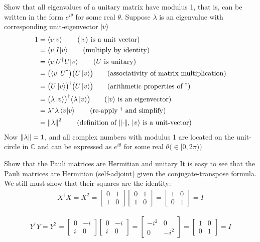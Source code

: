  Show that all eigenvalues of a unitary matrix have modulus 1, that is, can be written in the form $e^{i\theta}$ for some real $\theta$.
\Soln
Suppose $\lambda$ is an eigenvalue with corresponding unit-eigenvector $\ket{v}$
\begin{align*}
	1 &= \braket{v | v} \tag{$\ket{v}$ is a unit vector}\\
	&= \braket{v | I | v} \tag{multiply by identity}\\
	&= \braket{v | U^\dagger U  | v} \tag{$U$ is unitary}\\
	&= \bigl(\bra{v}U^\dagger\bigr)\bigl(U\ket{v}\bigr) \tag{associativity of matrix multiplication}\\
	&= \bigl(U\ket{v}\bigr)^\dagger\bigl(U\ket{v}\bigr) \tag{arithmetic properties of $^\dagger$}\\
	&= \bigl(\lambda\ket{v}\bigr)^\dagger\bigl(\lambda\ket{v}\bigr) \tag{$\ket{v}$ is an eigenvector} \\
	&= \lambda^*\lambda\braket{v | v} \tag{re-apply $^\dagger$ and simplify} \\
	&= \norm{\lambda}^2 \tag{definition of $\norm{\cdot}$, $\ket{v}$ is a unit-vector}
\end{align*}
Now $\left\lVert\lambda\right\rVert = 1$, and all complex numbers with modulus 1 are located on the unit-circle in $\mathbb{C}$ and can be expressed as $e^{i\theta}$ for some real $\theta \bigl(\in[0,2\pi)\bigr)$

 Show that the Pauli matrices are Hermitian and unitary
\Soln
It is easy to see that the Pauli matrices are Hermitian (self-adjoint) given the conjugate-transpose formula.  We still must show that their squares are the identity:
\begin{align*}
	X^\dagger X = X^2 = \begin{bmatrix}
		0 & 1 \\
		1 & 0
	\end{bmatrix}
	\begin{bmatrix}
		0 & 1 \\
		1 & 0
	\end{bmatrix}
	= \begin{bmatrix}
		1 & 0 \\
		0 & 1
	\end{bmatrix} = I
\end{align*}

\begin{align*}
	Y^\dagger Y = Y^2 = \begin{bmatrix}
		0 & -i \\
		i & 0
	\end{bmatrix}
	\begin{bmatrix}
		0 & -i \\
		i & 0
	\end{bmatrix}
	= \begin{bmatrix}
		-i^2 & 0 \\
		0 & -i^2
	\end{bmatrix} 
	= \begin{bmatrix}
		1 & 0 \\
		0 & 1
	\end{bmatrix} = I
\end{align*}

